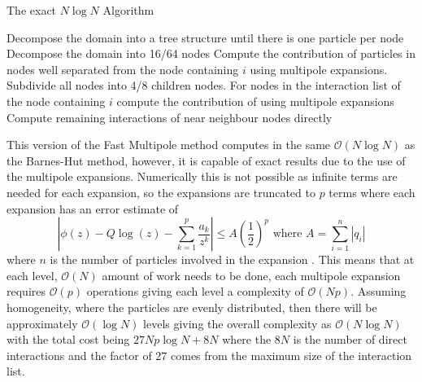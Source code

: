 \begin{algorithm}
\caption{The exact $N \log N$ Algorithm}\label{alg:FMMNlogN}
\begin{algorithmic}
\State Decompose the domain into a tree structure until there is one particle per node
    \State Decompose the domain into 16/64 nodes
    \State Compute the contribution of particles in nodes well separated from the node
    \State \; containing $i$ using multipole expansions.
    \Repeat
        \State Subdivide all nodes into 4/8 children nodes.
        \State For nodes in the interaction list of the node containing $i$ compute the 
        \State \; contribution of using multipole expansions
    \State Compute remaining interactions of near neighbour nodes directly
\EndFor
\end{algorithmic}
\end{algorithm}

This version of the Fast Multipole method computes in the same $\mathcal{O}(N\log N)$ as the Barnes-Hut method, however, it is capable of exact results due to the use of the multipole expansions. Numerically this is not possible as infinite terms are needed for each expansion, so the expansions are truncated to $p$ terms where each expansion has an error estimate of
\begin{equation*}
    \left|\phi(z)-Q \log (z)-\sum_{k=1}^{p} \frac{a_{k}}{z^{k}}\right| \leq A\left(\frac{1}{2}\right)^{p} \text{ where } A = \sum_{i=1}^{n} |q_i|
\end{equation*}
where $n$ is the number of particles involved in the expansion \cite{Beatson,Greengard1987ASimulations}. This means that at each level, $\mathcal{O}(N)$ amount of work needs to be done, each multipole expansion requires $\mathcal{O}(p)$ operations giving each level a complexity of $\mathcal{O}(Np)$. Assuming homogeneity, where the particles are evenly distributed, then there will be approximately $\mathcal{O}(\log N)$ levels giving the overall complexity as $\mathcal{O}(N\log N)$ with the total cost being $27Np\log N + 8N$ where the $8N$ is the number of direct interactions and the factor of $27$ comes from the maximum size of the interaction list. 

